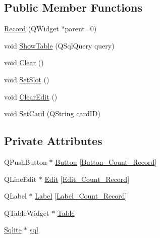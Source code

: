 \subsection*{Public Member Functions}
\begin{DoxyCompactItemize}
\item 
\mbox{\hyperlink{class_record_af85c9f8ff0abca5ee43b4a024557f38a}{Record}} (Q\+Widget $\ast$parent=0)
\item 
void \mbox{\hyperlink{class_record_aa1e340f0b1a776819d30d23c1424cbd2}{Show\+Table}} (Q\+Sql\+Query query)
\item 
void \mbox{\hyperlink{class_record_af70466cb248483ed2a32fb5a48a83cac}{Clear}} ()
\item 
void \mbox{\hyperlink{class_record_acc7b3423b809a15465c21f51353392d5}{Set\+Slot}} ()
\item 
void \mbox{\hyperlink{class_record_ad33ee61f2d53795e3090426aa3ba6af0}{Clear\+Edit}} ()
\item 
void \mbox{\hyperlink{class_record_ac08eeade2dbe9fd49ba7d508865f2ab1}{Set\+Card}} (Q\+String card\+ID)
\end{DoxyCompactItemize}
\subsection*{Private Attributes}
\begin{DoxyCompactItemize}
\item 
Q\+Push\+Button $\ast$ \mbox{\hyperlink{class_record_a5fa1d68f3e8af5da355a3d4ac4340876}{Button}} \mbox{[}\mbox{\hyperlink{record_8h_a4d319c985ecf15ec7ce151eea6e5f25e}{Button\+\_\+\+Count\+\_\+\+Record}}\mbox{]}
\item 
Q\+Line\+Edit $\ast$ \mbox{\hyperlink{class_record_ae969d53f57dbc379816588b35c17e58f}{Edit}} \mbox{[}\mbox{\hyperlink{record_8h_a02fbceef67a55fc0f21a7b2516ff47b3}{Edit\+\_\+\+Count\+\_\+\+Record}}\mbox{]}
\item 
Q\+Label $\ast$ \mbox{\hyperlink{class_record_a63bd65b95f9c397e2fb7102fae2dbb4b}{Label}} \mbox{[}\mbox{\hyperlink{record_8h_add5f3d7c7526d68cc7cff1d173adf1a1}{Label\+\_\+\+Count\+\_\+\+Record}}\mbox{]}
\item 
Q\+Table\+Widget $\ast$ \mbox{\hyperlink{class_record_a09a1c40c5b575561e3979ea0ea650110}{Table}}
\item 
\mbox{\hyperlink{class_sqlite}{Sqlite}} $\ast$ \mbox{\hyperlink{class_record_ab108613bccbe5871d86f87802689e8ad}{sql}}
\end{DoxyCompactItemize}



